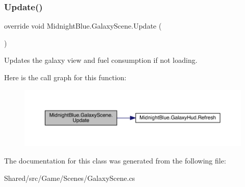 \subsubsection{\texorpdfstring{Update()}{Update()}}
{\footnotesize\ttfamily override void Midnight\+Blue.\+Galaxy\+Scene.\+Update (\begin{DoxyParamCaption}{ }\end{DoxyParamCaption})\hspace{0.3cm}{\ttfamily [inline]}}



Updates the galaxy view and fuel consumption if not loading. 

Here is the call graph for this function\+:
\nopagebreak
\begin{figure}[H]
\begin{center}
\leavevmode
\includegraphics[width=350pt]{class_midnight_blue_1_1_galaxy_scene_a9dfa66406143ed20f4d534c768f05a78_cgraph}
\end{center}
\end{figure}


The documentation for this class was generated from the following file\+:\begin{DoxyCompactItemize}
\item 
Shared/src/\+Game/\+Scenes/Galaxy\+Scene.\+cs\end{DoxyCompactItemize}
